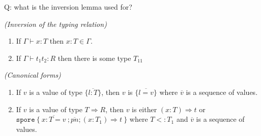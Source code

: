 \documentclass{llncs}
\newcommand{\seq}[1]{\overline{#1}}
\begin{document}
Q: what is the inversion lemma used for?

\begin{lemma}
\emph{(Inversion of the typing relation)}
\label{lem:inversion}
\begin{enumerate}
\item If $\Gamma \vdash x : T$ then $x : T \in \Gamma$.
\item If $\Gamma \vdash t_1 t_2 : R$ then there is some type $T_{11}$
\end{enumerate}
\end{lemma}


\begin{lemma}
\emph{(Canonical forms)}
\label{lem:canonical}
\begin{enumerate}

\item If $v$ is a value of type $\{ \seq{l : T} \}$, then $v$ is $\{ \seq{l = v} \}$ where $\seq{v}$ is a sequence of values.

\item If $v$ is a value of type $T \Rightarrow R$, then $v$ is either $(x: T) \Rightarrow t$ or \\ $\texttt{spore}~\{~\seq{x : T = v}~; \seq{pn} ; (x: T_1) \Rightarrow t~\}$ where $T <: T_1$ and $\seq{v}$ is a sequence of values.



\end{enumerate}
\end{lemma}
\end{document}
